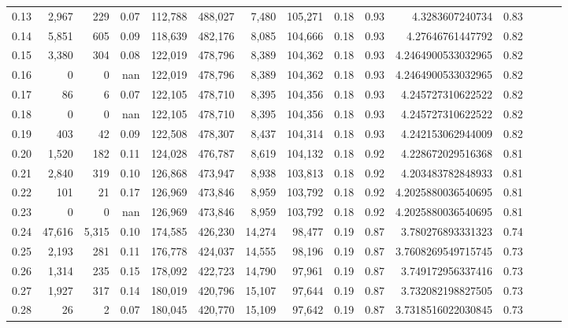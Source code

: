 \begin{tabular}{rrrrrrrrrrrrrrr}
0.13 &   2,967 &     229 &  0.07 &  112,788 &  488,027 &    7,480 &  105,271 &  0.18 &  0.93 &      4.3283607240734 &      0.83 \\
0.14 &   5,851 &     605 &  0.09 &  118,639 &  482,176 &    8,085 &  104,666 &  0.18 &  0.93 &     4.27646761447792 &      0.82 \\
0.15 &   3,380 &     304 &  0.08 &  122,019 &  478,796 &    8,389 &  104,362 &  0.18 &  0.93 &   4.2464900533032965 &      0.82 \\
0.16 &       0 &       0 &   nan &  122,019 &  478,796 &    8,389 &  104,362 &  0.18 &  0.93 &   4.2464900533032965 &      0.82 \\
0.17 &      86 &       6 &  0.07 &  122,105 &  478,710 &    8,395 &  104,356 &  0.18 &  0.93 &    4.245727310622522 &      0.82 \\
0.18 &       0 &       0 &   nan &  122,105 &  478,710 &    8,395 &  104,356 &  0.18 &  0.93 &    4.245727310622522 &      0.82 \\
0.19 &     403 &      42 &  0.09 &  122,508 &  478,307 &    8,437 &  104,314 &  0.18 &  0.93 &    4.242153062944009 &      0.82 \\
0.20 &   1,520 &     182 &  0.11 &  124,028 &  476,787 &    8,619 &  104,132 &  0.18 &  0.92 &    4.228672029516368 &      0.81 \\
0.21 &   2,840 &     319 &  0.10 &  126,868 &  473,947 &    8,938 &  103,813 &  0.18 &  0.92 &    4.203483782848933 &      0.81 \\
0.22 &     101 &      21 &  0.17 &  126,969 &  473,846 &    8,959 &  103,792 &  0.18 &  0.92 &   4.2025880036540695 &      0.81 \\
0.23 &       0 &       0 &   nan &  126,969 &  473,846 &    8,959 &  103,792 &  0.18 &  0.92 &   4.2025880036540695 &      0.81 \\
0.24 &  47,616 &   5,315 &  0.10 &  174,585 &  426,230 &   14,274 &   98,477 &  0.19 &  0.87 &    3.780276893331323 &      0.74 \\
0.25 &   2,193 &     281 &  0.11 &  176,778 &  424,037 &   14,555 &   98,196 &  0.19 &  0.87 &   3.7608269549715745 &      0.73 \\
0.26 &   1,314 &     235 &  0.15 &  178,092 &  422,723 &   14,790 &   97,961 &  0.19 &  0.87 &    3.749172956337416 &      0.73 \\
0.27 &   1,927 &     317 &  0.14 &  180,019 &  420,796 &   15,107 &   97,644 &  0.19 &  0.87 &    3.732082198827505 &      0.73 \\
0.28 &      26 &       2 &  0.07 &  180,045 &  420,770 &   15,109 &   97,642 &  0.19 &  0.87 &   3.7318516022030845 &      0.73 \\

\end{tabular}
